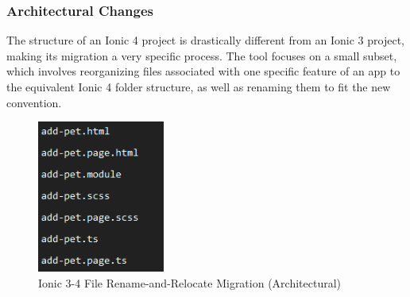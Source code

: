\documentclass[conference]{IEEEtran}
\begin{document}
\subsubsection{Architectural Changes}
The structure of an Ionic 4 project is drastically different from an Ionic 3 project,
making its migration a very specific process. The tool focuses on a small subset, which
involves reorganizing files associated with one specific feature of an app to the equivalent Ionic 4
folder structure, as well as renaming them to fit the new convention.
\begin{figure}[!htb]
    \centering
    \includegraphics[width=0.8\linewidth,height=5cm,keepaspectratio]{files.PNG}
    \caption{Ionic 3-4 File Rename-and-Relocate Migration (Architectural)}
    \label{fig:ionicFileMigration}
\end{figure}
\end{document}
